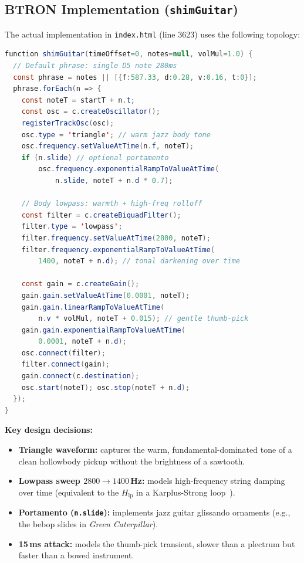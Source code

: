 \documentclass[10pt,journal,compsoc,twocolumn]{article}
\begin{document}
\subsection{BTRON Implementation (\texttt{shimGuitar})}

The actual implementation in \texttt{index.html} (line 3623) uses the
following topology:

\begin{lstlisting}[language=Java,
    caption={\texttt{shimGuitar}: Watanabe hollowbody (index.html line 3623).}]
function shimGuitar(timeOffset=0, notes=null, volMul=1.0) {
  // Default phrase: single D5 note 280ms
  const phrase = notes || [{f:587.33, d:0.28, v:0.16, t:0}];
  phrase.forEach(n => {
    const noteT = startT + n.t;
    const osc = c.createOscillator();
    registerTrackOsc(osc);
    osc.type = 'triangle'; // warm jazz body tone
    osc.frequency.setValueAtTime(n.f, noteT);
    if (n.slide) // optional portamento
        osc.frequency.exponentialRampToValueAtTime(
            n.slide, noteT + n.d * 0.7);

    // Body lowpass: warmth + high-freq rolloff
    const filter = c.createBiquadFilter();
    filter.type = 'lowpass';
    filter.frequency.setValueAtTime(2800, noteT);
    filter.frequency.exponentialRampToValueAtTime(
        1400, noteT + n.d); // tonal darkening over time

    const gain = c.createGain();
    gain.gain.setValueAtTime(0.0001, noteT);
    gain.gain.linearRampToValueAtTime(
        n.v * volMul, noteT + 0.015); // gentle thumb-pick
    gain.gain.exponentialRampToValueAtTime(
        0.0001, noteT + n.d);
    osc.connect(filter);
    filter.connect(gain);
    gain.connect(c.destination);
    osc.start(noteT); osc.stop(noteT + n.d);
  });
}
\end{lstlisting}

\textbf{Key design decisions:}
\begin{itemize}[leftmargin=*]
    \item \textbf{Triangle waveform:} captures the warm, fundamental-dominated
    tone of a clean hollowbody pickup without the brightness of a sawtooth.
    \item \textbf{Lowpass sweep $2800 \to 1400$\,Hz:} models high-frequency
    string damping over time (equivalent to the $H_{\mathrm{lp}}$ in a
    Karplus-Strong loop~\cite{karplus1983digital}).
    \item \textbf{Portamento (\texttt{n.slide}):} implements jazz guitar
    glissando ornaments (e.g., the bebop slides in \emph{Green Caterpillar}).
    \item \textbf{15\,ms attack:} models the thumb-pick transient, slower than
    a plectrum but faster than a bowed instrument.
\end{itemize}
\end{document}
